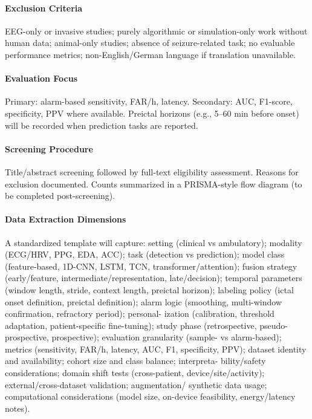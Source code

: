 \paragraph{Exclusion Criteria}
EEG-only or invasive studies; purely algorithmic or simulation-only work
without human data; animal-only studies; absence of seizure-related
task; no evaluable performance metrics; non-English/German language if
translation unavailable.

\paragraph{Evaluation Focus}
Primary: alarm-based sensitivity, FAR/h, latency. Secondary: AUC,
F1-score, specificity, PPV where available. Preictal horizons (e.g.,
5--60 min before onset) will be recorded when prediction tasks are
reported.

\paragraph{Screening Procedure}
Title/abstract screening followed by full-text eligibility assessment.
Reasons for exclusion documented. Counts summarized in a PRISMA-style
flow diagram (to be completed post-screening).

\paragraph{Data Extraction Dimensions}
A standardized template will capture: setting (clinical vs
ambulatory); modality (ECG/HRV, PPG, EDA, ACC); task (detection vs
prediction); model class (feature-based, 1D-CNN, LSTM, TCN,
transformer/attention); fusion strategy (early/feature,
intermediate/representation, late/decision); temporal parameters
(window length, stride, context length, preictal horizon); labeling
policy (ictal onset definition, preictal definition); alarm logic
(smoothing, multi-window confirmation, refractory period); personal-
ization (calibration, threshold adaptation, patient-specific
fine-tuning); study phase (retrospective, pseudo-prospective,
prospective); evaluation granularity (sample- vs alarm-based); metrics
(sensitivity, FAR/h, latency, AUC, F1, specificity, PPV); dataset
identity and availability; cohort size and class balance; interpreta-
bility/safety considerations; domain shift tests (cross-patient,
device/site/activity); external/cross-dataset validation; augmentation/
synthetic data usage; computational considerations (model size,
on-device feasibility, energy/latency notes).

